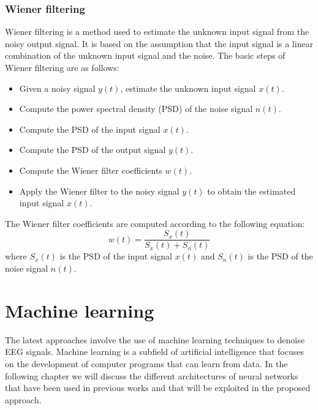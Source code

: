 \documentclass[a4paper]{sapthesis}
\begin{document}
\subsubsection{Wiener filtering}
Wiener filtering\cite{wiener} is a method used to estimate the unknown
input signal from the noisy output signal. It is based on the assumption
that the input signal is a linear combination of the unknown input signal
and the noise. \newline
The basic steps of Wiener filtering are as follows:
\begin{itemize}
    \item Given a noisy signal $y(t)$, estimate the unknown input signal
    $x(t)$.
    \item Compute the power spectral density (PSD) of the noise signal
    $n(t)$.
    \item Compute the PSD of the input signal $x(t)$.
    \item Compute the PSD of the output signal $y(t)$.
    \item Compute the Wiener filter coefficients $w(t)$.
    \item Apply the Wiener filter to the noisy signal $y(t)$ to obtain the
    estimated input signal $x(t)$.
\end{itemize}
The Wiener filter coefficients are computed according to the following
equation:
\begin{equation}
\label{eq:wiener}
w(t) = \frac{S_x(t)}{S_x(t) + S_n(t)}
\end{equation}
where $S_x(t)$ is the PSD of the input signal $x(t)$ and $S_n(t)$ is the
PSD of the noise signal $n(t)$. \newline



\section{Machine learning}
The latest approaches involve the use of machine learning techniques
to denoise EEG signals. Machine learning is a subfield of artificial
intelligence that focuses on the development of computer programs that
can learn from data. In the following chapter we will discuss the
different architectures of neural networks that have been used in 
previous works and that will be exploited in the proposed approach.
\end{document}
